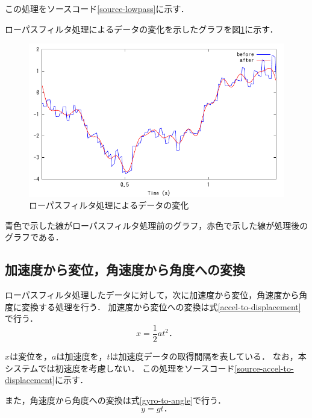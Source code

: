 この処理をソースコード\ref{source-lowpass}に示す．



ローパスフィルタ処理によるデータの変化を示したグラフを図\ref{graph-lowpass}に示す．

\begin{figure}[hbtp]
  \centering
  \includegraphics[bb=0 0 360 216, width=12cm]{Graphs/lowpass.pdf}
  \caption{ローパスフィルタ処理によるデータの変化}
  \label{graph-lowpass}
\end{figure}

青色で示した線がローパスフィルタ処理前のグラフ，赤色で示した線が処理後のグラフである．

\subsection{加速度から変位，角速度から角度への変換}
ローパスフィルタ処理したデータに対して，次に加速度から変位，角速度から角度に変換する処理を行う．
加速度から変位への変換は式\ref{accel-to-displacement}で行う．
\begin{equation}
\label{accel-to-displacement}
x = \frac{1}{2} a t^2．
\end{equation}

$x$は変位を，$a$は加速度を，$t$は加速度データの取得間隔を表している．
なお，本システムでは初速度を考慮しない．
この処理をソースコード\ref{source-accel-to-displacement}に示す．



また，角速度から角度への変換は式\ref{gyro-to-angle}で行う．
\begin{equation}
\label{gyro-to-angle}
y = g t．
\end{equation}

